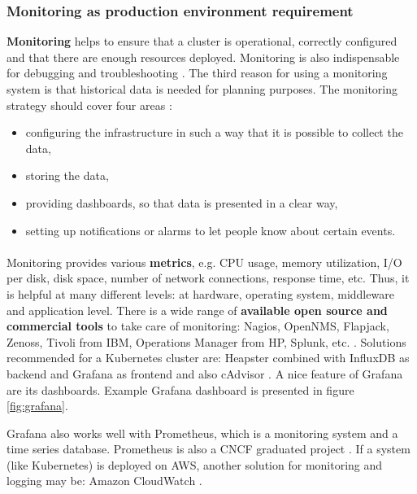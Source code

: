 \subsubsection{Monitoring as production environment requirement}
\textbf{Monitoring} helps to ensure that a cluster is operational, correctly configured and that there are enough resources deployed. Monitoring is also indispensable for debugging and troubleshooting \cite{book-mastering-k8s}. The third reason for using a monitoring system is that historical data is needed for planning purposes. The monitoring strategy should cover four areas \cite{book-cicd}:
\begin{itemize}
\item configuring the infrastructure in such a way that it is possible to collect the data,
\item storing the data,
\item providing dashboards, so that data is presented in a clear way,
\item setting up notifications or alarms to let people know about certain events.
\end{itemize}
\paragraph{}
Monitoring provides various \textbf{metrics}, e.g. CPU usage, memory utilization, I/O per disk, disk space, number of network connections, response time, etc. Thus, it is helpful at many different levels: at hardware, operating system,  middleware and application level. There is a wide range of \textbf{available open source and commercial tools} to take care of monitoring: Nagios, OpenNMS, Flapjack, Zenoss, Tivoli from IBM, Operations Manager from HP, Splunk, etc. \cite{book-cicd}. Solutions recommended for a Kubernetes cluster are: Heapster combined with InfluxDB as backend and Grafana as frontend and also cAdvisor \cite{book-mastering-k8s}. A nice feature of Grafana are its dashboards. Example Grafana dashboard is presented in figure \ref{fig:grafana}.

Grafana also works well with Prometheus, which is a monitoring system and a time series database. Prometheus is also a CNCF graduated project \cite{online-prometheus-gh,online-prometheus-www}. If a system (like Kubernetes) is deployed on AWS, another solution for monitoring and logging may be: Amazon CloudWatch \cite{online-cw}.

